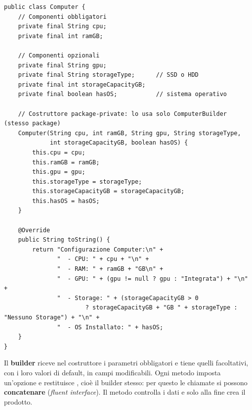 \begin{lstlisting}[style=java, name=Computer.java]
public class Computer {
    // Componenti obbligatori
    private final String cpu;
    private final int ramGB;

    // Componenti opzionali
    private final String gpu;
    private final String storageType;      // SSD o HDD
    private final int storageCapacityGB;
    private final boolean hasOS;           // sistema operativo

    // Costruttore package-private: lo usa solo ComputerBuilder (stesso package)
    Computer(String cpu, int ramGB, String gpu, String storageType,
             int storageCapacityGB, boolean hasOS) {
        this.cpu = cpu;
        this.ramGB = ramGB;
        this.gpu = gpu;
        this.storageType = storageType;
        this.storageCapacityGB = storageCapacityGB;
        this.hasOS = hasOS;
    }

    @Override
    public String toString() {
        return "Configurazione Computer:\n" +
               "  - CPU: " + cpu + "\n" +
               "  - RAM: " + ramGB + "GB\n" +
               "  - GPU: " + (gpu != null ? gpu : "Integrata") + "\n" +
               "  - Storage: " + (storageCapacityGB > 0
                       ? storageCapacityGB + "GB " + storageType : "Nessuno Storage") + "\n" +
               "  - OS Installato: " + hasOS;
    }
}
\end{lstlisting}

Il \textbf{builder} riceve nel costruttore i parametri obbligatori e tiene quelli facoltativi, con i loro valori di
default, in campi modificabili. Ogni metodo  imposta un'opzione e restituisce , cioè il builder
stesso: per questo le chiamate si possono \textbf{concatenare} (\textit{fluent interface}). Il metodo 
controlla i dati e solo alla fine crea il prodotto.

